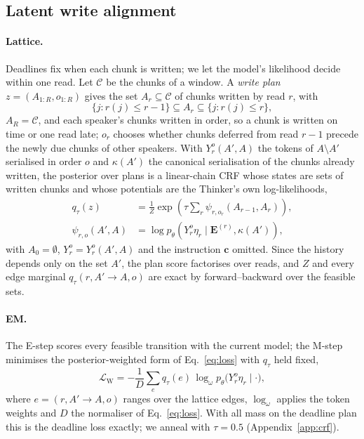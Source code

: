 \subsection{Latent write alignment}
\label{sec:method-latent}

\paragraph{Lattice.} Deadlines fix when each chunk is written; we let the model's likelihood decide within one read. Let
$\mathcal{C}$ be the chunks of a window. A \emph{write plan} $z=(A_{1:R},o_{1:R})$ gives the set
$A_r\subseteq\mathcal{C}$ of chunks written by read $r$, with
\begin{equation}
\{j:r(j)\le r-1\}\subseteq A_r\subseteq\{j:r(j)\le r\},
\label{eq:lattice}
\end{equation}
$A_R=\mathcal{C}$, and each speaker's chunks written in order, so a chunk is written on time or one read late; $o_r$ chooses whether chunks
deferred from read $r-1$ precede the newly due chunks of other speakers. With $Y_r^{o}(A',A)$ the tokens of
$A\setminus A'$ serialised in order $o$ and $\kappa(A')$ the canonical serialisation of the chunks already written, the
posterior over plans is a linear-chain CRF whose states are sets of written chunks and whose potentials are the
Thinker's own log-likelihoods,
\begin{equation}
\begin{aligned}
q_\tau(z)&=\tfrac{1}{Z}\exp(\tau\textstyle\sum_{r}\psi_{r,o_r}(A_{r-1},A_r)),\\
\psi_{r,o}(A',A)&=\log p_\theta(Y_r^{o}\eta_r\mid\bm{E}^{(r)},\kappa(A')),
\end{aligned}
\label{eq:post}
\end{equation}
with $A_0=\emptyset$, $Y_r^o=Y_r^o(A',A)$ and the instruction $\bm{c}$ omitted.
Since the history depends only on the set $A'$, the plan score factorises over reads, and $Z$ and every edge marginal
$q_\tau(r,A'\!\to\!A,o)$ are exact by forward--backward over the feasible sets.

\paragraph{EM.} The E-step scores every feasible transition with the current model; the M-step minimises the
posterior-weighted form of Eq.~\eqref{eq:loss} with $q_\tau$ held fixed,
\begin{equation}
\mathcal{L}_{\mathrm{W}}=-\frac{1}{D}\sum_{e}q_\tau(e)\,
\log_\omega p_\theta\big(Y_r^{o}\eta_r\mid\cdot\big),
\label{eq:mstep}
\end{equation}
where $e=(r,A'\!\to\!A,o)$ ranges over the lattice edges, $\log_\omega$ applies the token weights and $D$ the normaliser of Eq.~\eqref{eq:loss}. With all mass on the deadline
plan this is the deadline loss exactly; we anneal with $\tau=0.5$ (Appendix~\ref{app:crf}).

